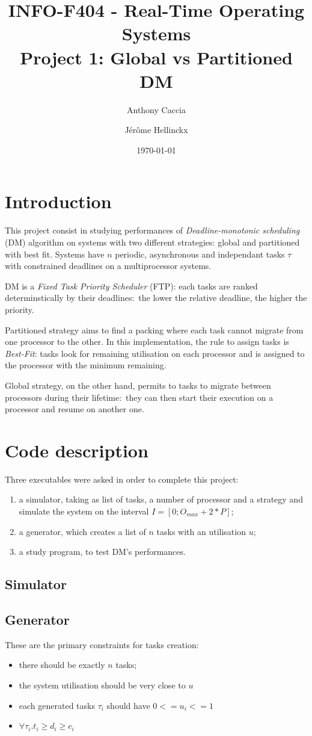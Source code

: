 \documentclass{scrartcl}
\title{INFO-F404 - Real-Time Operating Systems\\Project 1: Global vs Partitioned DM}
\author{Anthony Caccia \and J\'{e}r\^{o}me Hellinckx}
\date{\today}
\begin{document}
\maketitle

\section{Introduction}
This project consist in studying performances of \emph{Deadline-monotonic scheduling} (DM) algorithm on systems with two different strategies: global and partitioned with best fit. Systems have $n$ periodic, asynchronous and independant tasks $\tau$ with constrained deadlines on a multiprocessor systems.

DM is a \emph{Fixed Task Priority Scheduler} (FTP): each tasks are ranked determinstically by their deadlines: the lower the relative deadline, the higher the priority.

Partitioned strategy aims to find a packing where each task cannot migrate from one processor to the other. In this implementation, the rule to assign tasks is \emph{Best-Fit}: tasks look for remaining utilisation on each processor and is assigned to the processor with the minimum remaining.

Global strategy, on the other hand, permits to tasks to migrate between processors during their lifetime: they can then start their execution on a processor and resume on another one.

\section{Code description}
Three executables were asked in order to complete this project:
\begin{enumerate}
  \item a simulator, taking as list of tasks, a number of processor and a strategy and simulate the system on the interval $I = [0; O_{max} + 2 * P]$;
  \item a generator, which creates a list of $n$ tasks with an utilisation $u$;
  \item a study program, to test DM's performances.
\end{enumerate}

\subsection{Simulator}

\subsection{Generator}
\label{gendesc}
These are the primary constraints for tasks creation:
\begin{itemize}
  \item there should be exactly $n$ tasks;
  \item the system utilisation should be very close to $u$
  \item each generated tasks $\tau_i$ should have $0 <= u_i <= 1$
  \item $\forall \tau_i. t_i \geq d_i \geq c_i$
\end{itemize}
\end{document}
